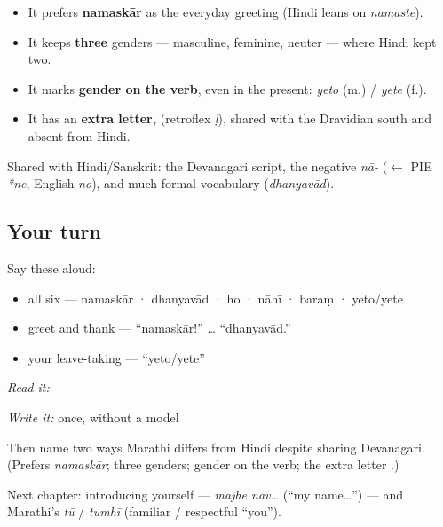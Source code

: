 \begin{grammarlens}[title={What you've built}]
\begin{itemize}
\raggedright
  \item It prefers \textbf{namaskār} as the everyday greeting (Hindi leans on \emph{namaste}).
  \item It keeps \textbf{three} genders — masculine, feminine, neuter — where Hindi kept two.
  \item It marks \textbf{gender on the verb}, even in the present: \emph{yeto} (m.) / \emph{yete} (f.).
  \item It has an \textbf{extra letter, } (retroflex \emph{ḷ}), shared with the Dravidian south and absent from Hindi.
\end{itemize}

Shared with Hindi/Sanskrit: the Devanagari script, the negative \emph{nā-} ($\leftarrow$ PIE \emph{*ne}, English \emph{no}), and much formal vocabulary (\emph{dhanyavād}).
\end{grammarlens}

\subsection*{Your turn}
Say these aloud:

\begin{itemize}
\raggedright
  \item all six — namaskār · dhanyavād · ho · nāhī · baraṃ · yeto/yete
  \item greet and thank — \textquotedblleft{}namaskār!\textquotedblright{} … \textquotedblleft{}dhanyavād.\textquotedblright{}
  \item your leave-taking — \textquotedblleft{}yeto/yete\textquotedblright{}
\end{itemize}

\begin{tcolorbox}[breakable,colback=teal!4,colframe=teal!35!black,title={Before you move on}]
\emph{Read it:} \textbf{}

\emph{Write it:} \textbf{} once, without a model

Then name two ways Marathi differs from Hindi despite sharing Devanagari. (Prefers \emph{namaskār}; three genders; gender on the verb; the extra letter \emph{}.)

Next chapter: introducing yourself — \emph{mājhe nāv…} (\textquotedblleft{}my name…\textquotedblright{}) — and Marathi's \emph{tū} / \emph{tumhī} (familiar / respectful \textquotedblleft{}you\textquotedblright{}).
\end{tcolorbox}
